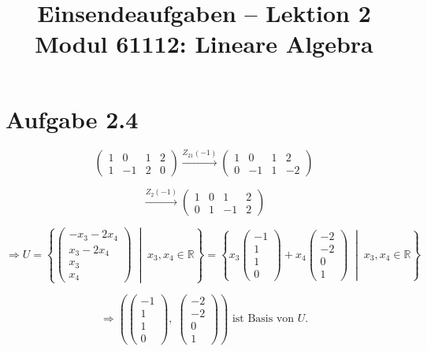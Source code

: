 \documentclass[a4paper,12pt]{article}
\title{Einsendeaufgaben -- Lektion 2\\[0.5em]
\large Modul 61112: Lineare Algebra}
\author{}
\date{}
\begin{document}
\maketitle

\section*{Aufgabe 2.4}

\[
  \begin{pmatrix} 1 & 0 & 1 & 2 \\ 1 & -1 & 2 & 0 \end{pmatrix}
  \xrightarrow{Z_{21}(-1)}
  \begin{pmatrix} 1 & 0 & 1 & 2 \\ 0 & -1 & 1 & -2 \end{pmatrix}
\]

\[
  \xrightarrow{Z_2(-1)}
  \begin{pmatrix} 1 & 0 & 1 & 2 \\ 0 & 1 & -1 & 2 \end{pmatrix}
\]

\[
  \Rightarrow U = \left\{ \begin{pmatrix} -x_3 - 2x_4 \\ x_3 - 2x_4 \\ x_3 \\ x_4 \end{pmatrix} \;\middle|\; x_3, x_4 \in \mathbb{R} \right\}
  = \left\{ x_3 \begin{pmatrix} -1 \\ 1 \\ 1 \\ 0 \end{pmatrix} + x_4 \begin{pmatrix} -2 \\ -2 \\ 0 \\ 1 \end{pmatrix} \;\middle|\; x_3, x_4 \in \mathbb{R} \right\}
\]

\[
  \Rightarrow \left( \begin{pmatrix} -1 \\ 1 \\ 1 \\ 0 \end{pmatrix},\; \begin{pmatrix} -2 \\ -2 \\ 0 \\ 1 \end{pmatrix} \right) \text{ ist Basis von } U.
\]
\end{document}
